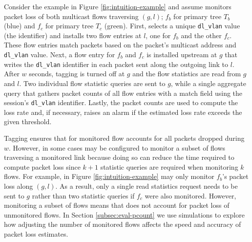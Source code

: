 Consider the example in Figure \ref{fig:intuition-example} and assume \pcnt monitors packet loss of both multicast flows traversing $(g,l)$; $f_b$ for primary tree $T_b$ (blue) 
and $f_c$ for primary tree $T_c$ (green). %
First, \pcnt selects a unique {\tt dl\_vlan} value (the identifier) and installs two flow entries at $l$, one for $f_b$ and the other $f_c$. 
These flow entries match packets based on the packet's multicast address and {\tt dl\_vlan} value.
Next, a flow entry for $f_b$ and $f_c$ is installed upstream at $g$ that writes the {\tt dl\_vlan} identifier in each packet sent along the outgoing link to $l$.  After
$w$ seconds, tagging is turned off at $g$ and the flow statistics are read from $g$ and $l$.  Two individual flow statistic queries are sent to $g$, while a single aggregate query
that gathers packet counts of all flow entries with a match field using the session's {\tt dl\_vlan} identifier.  Lastly, the packet counts are used to compute the loss rate
and, if necessary, \pcnt raises an alarm if the estimated loss rate exceeds the given threshold.


Tagging ensures that for monitored flow \pcnt accounts for all packets dropped during $w$. %
However, in some cases \pcnt may be configured to monitor a subset of flows traversing a monitored link because doing so can reduce the time required to compute packet loss since 
$k+1$ statistic queries are required when monitoring $k$ flows.  For example, in Figure \ref{fig:intuition-example} \pcnt may only monitor $f_b$'s packet loss along $(g,l)$.  As a result,
only a single read statistics request needs to be sent to $g$ rather than two statistic queries if $f_c$ were also monitored.  However, monitoring a subset of flows means that
\pcnt does not account for packet loss of unmonitored flows.  In Section \ref{subsec:eval-pcount} we use simulations to explore how adjusting the number of monitored flows 
affects the  speed and accuracy of packet loss estimates.


